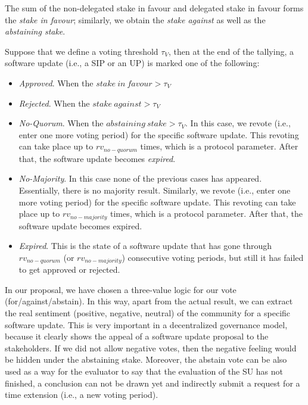 The sum of the non-delegated stake in favour and delegated stake in favour forms
the \emph{stake in favour}; similarly, we obtain the \emph{stake against} as
well as the \emph{abstaining stake}.

Suppose that we define a voting threshold $\tau_V$, then at the end of the
tallying, a software update (i.e., a SIP or an UP) is marked one of the
following:
\begin{itemize}

\item \emph{Approved}. When the $stake\ in\ favour > \tau_V$

\item \emph{Rejected}. When the $stake\ against > \tau_V$

\item \emph{No-Quorum}. When the $abstaining\ stake > \tau_V$. In this case, we
  revote (i.e., enter one more voting period) for the specific software update.
  This revoting can take place up to $rv_{no-quorum}$ times, which is a protocol
  parameter. After that, the software update becomes \emph{expired}.

\item \emph{No-Majority}. In this case none of the previous cases has appeared.
  Essentially, there is no majority result. Similarly, we revote (i.e., enter
  one more voting period) for the specific software update. This revoting can
  take place up to $rv_{no-majority}$ times, which is a protocol parameter.
  After that, the software update becomes expired.

\item \emph{Expired}. This is the state of a software update that has gone
  through $rv_{no-quorum}$ (or $rv_{no-majority}$) consecutive voting periods,
  but still it has failed to get approved or rejected.
\end{itemize}

In our proposal, we have chosen a three-value logic for our vote
(for/against/abstain). In this way, apart from the actual result, we can extract
the real sentiment (positive, negative, neutral) of the community for a specific
software update. This is very important in a decentralized governance model,
because it clearly shows the appeal of a software update proposal to the
stakeholders. If we did not allow negative votes, then the negative feeling
would be hidden under the abstaining stake.
Moreover, the abstain vote can be also used as a way for the evaluator to say
that the evaluation of the SU has not finished, a conclusion can not be drawn
yet and indirectly submit a request for a time extension (i.e., a new voting
period).

